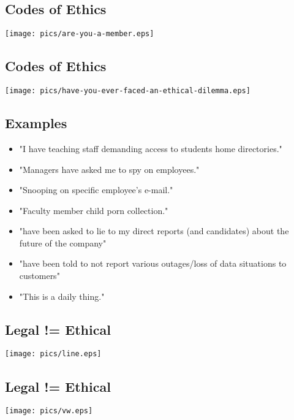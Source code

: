 \documentclass[xga]{xdvislides}
\begin{document}
\subsection{Codes of Ethics}
\vspace*{\fill}
\begin{center}
	\texttt{[image: pics/are-you-a-member.eps]}
\end{center}
\vspace*{\fill}

\subsection{Codes of Ethics}
\vspace*{\fill}
\begin{center}
	\texttt{[image: pics/have-you-ever-faced-an-ethical-dilemma.eps]}
\end{center}
\vspace*{\fill}

\subsection{Examples}
\begin{itemize}
	\item "I have teaching staff demanding access to students home directories."
	\item "Managers have asked me to spy on employees."
	\item "Snooping on specific employee's e-mail."
	\item "Faculty member child porn collection."
	\item "have been asked to lie to my direct reports (and candidates) about the future of the company"
	\item "have been told to not report various outages/loss of data situations to customers"
	\item "This is a daily thing."
\end{itemize}

\subsection{Legal != Ethical}
\vspace*{\fill}
\begin{center}
	\texttt{[image: pics/line.eps]}
\end{center}
\vspace*{\fill}

\subsection{Legal != Ethical}
\vspace*{\fill}
\begin{center}
	\texttt{[image: pics/vw.eps]}
\end{center}
\vspace*{\fill}
\end{document}
